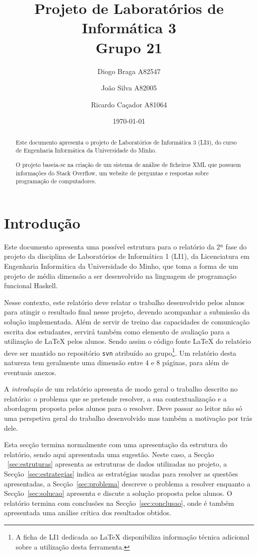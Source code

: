 \documentclass[a4paper]{article}
\title{Projeto de Laboratórios de Informática 3\\Grupo 21}
\author{Diogo Braga A82547 \and João Silva A82005 \and Ricardo Caçador A81064}
\date{\today}
\begin{document}
\maketitle

\begin{abstract}
  Este documento apresenta o projeto de Laboratórios de Informática
  3 (LI3), do curso de Engenharia Informática da Universidade
  do Minho.

  O projeto baseia-se na criação de um sistema de análise de ficheiros 
  XML que possuem informações do Stack Overflow, um website de perguntas
  e respostas sobre programação de computadores.

\end{abstract}

\tableofcontents
\listoffigures

\section{Introdução}
\label{sec:intro}

Este documento apresenta uma possível estrutura para o relatório da 2ª
fase do projeto da disciplina de Laboratórios de Informática 1 (LI1),
da Licenciatura em Engenharia Informática da Universidade do Minho,
que toma a forma de um projeto de média dimensão a ser desenvolvido na
linguagem de programação funcional Haskell.

Nesse contexto, este relatório deve relatar o trabalho desenvolvido
pelos alunos para atingir o resultado final nesse projeto, devendo
acompanhar a submissão da solução implementada. Além de servir de
treino das capacidades de comunicação escrita dos estudantes, servirá
também como elemento de avaliação para a utilização de \LaTeX{} pelos
alunos. Sendo assim o código fonte \LaTeX{} do relatório deve ser
mantido no repositório \texttt{svn} atribuído ao grupo\footnote{A
  ficha de LI1 dedicada ao \LaTeX{} disponibiliza informação técnica
  adicional sobre a utilização desta ferramenta.}. Um relatório desta
natureza tem geralmente uma dimensão entre 4 e 8 páginas, para além de
eventuais anexos.

A \emph{introdução} de um relatório apresenta de modo geral o trabalho
descrito no relatório: o problema que se pretende resolver, a sua
contextualização e a abordagem proposta pelos alunos para o
resolver. Deve passar ao leitor não só uma perspetiva geral do
trabalho desenvolvido mas também a motivação por trás dele.

Esta secção termina normalmente com uma apresentação da estrutura do
relatório, sendo aqui apresentada uma sugestão. Neste caso, a Secção
~\ref{sec:estruturas} apresenta as estruturas de dados utilizadas 
no projeto, a Secção~\ref{sec:estrategias} indica as estratégias usadas 
para resolver as  questões apresentadas, a Secção~\ref{sec:problema} descreve 
o problema a resolver enquanto a Secção~\ref{sec:solucao} apresenta e 
discute a solução proposta pelos alunos. O relatório termina com conclusões na
Secção~\ref{sec:conclusao}, onde é também apresentada uma análise
crítica dos resultados obtidos.
\end{document}
